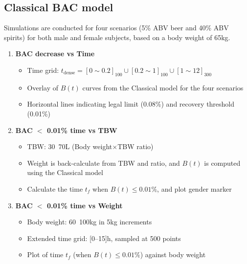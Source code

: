 \documentclass[11pt]{article}
\begin{document}
\subsection{Classical BAC model}
Simulations are conducted for four scenarios (5\% ABV beer and 40\% ABV spirits) for both male and female subjects, based on a body weight of 65kg.
\begin{enumerate}
  \item \textbf{BAC decrease vs Time}\
    \begin{itemize}
      \item Time grid: $t_{\mathrm{dense}}=[0\sim0.2]_{100}\cup[0.2\sim1]_{100}\cup[1\sim12]_{300}$
      \item Overlay of $B(t)$ curves from the Classical model for the four scenarios
      \item Horizontal lines indicating legal limit (0.08\%) and recovery threshold (0.01\%)
    \end{itemize}

  \item \textbf{BAC $<$ 0.01\% time vs TBW}\
    \begin{itemize}
      \item TBW: 30~70L (Body weight$\times$TBW ratio)
      \item Weight is back-calculate from TBW and ratio, and $B(t)$ is computed using the Classical model
      \item Calculate the time $t_f$ when $B(t)\le0.01\%$, and plot gender marker 
    \end{itemize}

  \item \textbf{BAC $<$ 0.01\% time vs Weight}\
    \begin{itemize}
      \item Body weight: 60~100kg in 5kg increments
      \item Extended time grid: [0–15]h, sampled at 500 points
      \item Plot of time $t_f$ (when $B(t) \le 0.01\%$) against body weight
    \end{itemize}
\end{enumerate}
\end{document}
